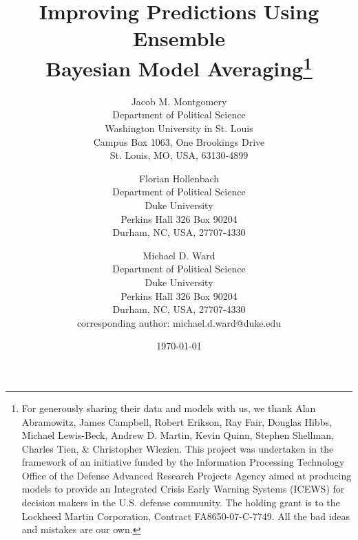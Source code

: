 \documentclass[12pt,fullpage]{article}
\title{Improving Predictions Using Ensemble \\ Bayesian Model
  Averaging\thanks{For generously sharing their data and models with
    us, we thank Alan Abramowitz, James Campbell, Robert Erikson, Ray
    Fair, Douglas Hibbs, Michael Lewis-Beck, Andrew D. Martin, Kevin
    Quinn, Stephen Shellman, Charles Tien, \& Christopher Wlezien.
    This project was undertaken in the framework of an initiative
    funded by the Information Processing Technology Office of the
    Defense Advanced Research Projects Agency aimed at producing
    models to provide an Integrated Crisis Early Warning Systems
    (ICEWS) for decision makers in the U.S. defense community. The
    holding grant is to the Lockheed Martin Corporation, Contract
    FA8650-07-C-7749. All the bad ideas and mistakes are our own.  }}
\author{
Jacob M. Montgomery\\
	Department of Political Science\\
	Washington University in St. Louis\\
	Campus Box 1063, One Brookings Drive\\
	St. Louis, MO, USA, 63130-4899 
	\and
Florian Hollenbach  \\
	Department of Political Science\\
	Duke University\\
	Perkins Hall 326 Box 90204\\
	Durham, NC, USA, 27707-4330
	\and
Michael D. Ward\\
	Department of Political Science\\
	Duke University\\
	Perkins Hall 326 Box 90204\\
	Durham, NC, USA, 27707-4330\\
	corresponding author: michael.d.ward@duke.edu
}
\date{\today}
\begin{document}
\pagestyle{myheadings}
 \singlespacing

\thispagestyle{empty}



\begin{abstract}
\begin{doublespace}

\end{doublespace}
\end{abstract}

\doublespacing
\newpage




\setcounter{page}{1}





\singlespacing

%


\theendnotes

\newpage

\listoffigures


\clearpage






\end{document}
